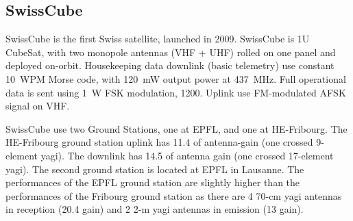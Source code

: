 \subsection{SwissCube}
SwissCube is the first Swiss satellite, launched in 2009. SwissCube is 1U CubeSat, with two monopole antennas (VHF + UHF) rolled on one panel and deployed on-orbit. Housekeeping data downlink (basic telemetry) use constant \si{10}~WPM Morse code, with \SI{120}{\milli\watt} output power at \SI{437}{\MHz}. Full operational data is sent using \SI{1}{\watt} FSK modulation, \SI{1200}{\bps}. Uplink use FM-modulated AFSK signal on VHF. 

SwissCube use two Ground Stations, one at EPFL, and one at HE-Fribourg. The HE-Fribourg ground station uplink has \SI{11.4}{\dBi} of antenna-gain (one crossed \si{9}-element yagi). The downlink has \SI{14.5}{\dBi} of antenna gain (one crossed \si{17}-element yagi). The second ground station is located at EPFL in Lausanne. The performances of the EPFL ground station are slightly higher than the performances of the Fribourg ground station as there are \si{4} \si{70}-cm yagi antennas in reception (\SI{20.4}{\dBi} gain) and \si{2} \si{2}-m yagi antennas in emission (\SI{13}{\dBi} gain). \cite{swisscube_groundstation}

